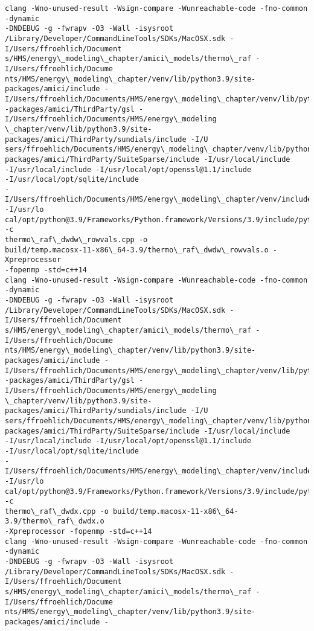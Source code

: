 \documentclass[11pt]{article}
\begin{document}
\begin{Verbatim}[commandchars=\\\{\}]
clang -Wno-unused-result -Wsign-compare -Wunreachable-code -fno-common -dynamic
-DNDEBUG -g -fwrapv -O3 -Wall -isysroot
/Library/Developer/CommandLineTools/SDKs/MacOSX.sdk -I/Users/ffroehlich/Document
s/HMS/energy\_modeling\_chapter/amici\_models/thermo\_raf -I/Users/ffroehlich/Docume
nts/HMS/energy\_modeling\_chapter/venv/lib/python3.9/site-packages/amici/include -
I/Users/ffroehlich/Documents/HMS/energy\_modeling\_chapter/venv/lib/python3.9/site
-packages/amici/ThirdParty/gsl -I/Users/ffroehlich/Documents/HMS/energy\_modeling
\_chapter/venv/lib/python3.9/site-packages/amici/ThirdParty/sundials/include -I/U
sers/ffroehlich/Documents/HMS/energy\_modeling\_chapter/venv/lib/python3.9/site-
packages/amici/ThirdParty/SuiteSparse/include -I/usr/local/include
-I/usr/local/include -I/usr/local/opt/openssl@1.1/include
-I/usr/local/opt/sqlite/include
-I/Users/ffroehlich/Documents/HMS/energy\_modeling\_chapter/venv/include -I/usr/lo
cal/opt/python@3.9/Frameworks/Python.framework/Versions/3.9/include/python3.9 -c
thermo\_raf\_dwdw\_rowvals.cpp -o
build/temp.macosx-11-x86\_64-3.9/thermo\_raf\_dwdw\_rowvals.o -Xpreprocessor
-fopenmp -std=c++14
clang -Wno-unused-result -Wsign-compare -Wunreachable-code -fno-common -dynamic
-DNDEBUG -g -fwrapv -O3 -Wall -isysroot
/Library/Developer/CommandLineTools/SDKs/MacOSX.sdk -I/Users/ffroehlich/Document
s/HMS/energy\_modeling\_chapter/amici\_models/thermo\_raf -I/Users/ffroehlich/Docume
nts/HMS/energy\_modeling\_chapter/venv/lib/python3.9/site-packages/amici/include -
I/Users/ffroehlich/Documents/HMS/energy\_modeling\_chapter/venv/lib/python3.9/site
-packages/amici/ThirdParty/gsl -I/Users/ffroehlich/Documents/HMS/energy\_modeling
\_chapter/venv/lib/python3.9/site-packages/amici/ThirdParty/sundials/include -I/U
sers/ffroehlich/Documents/HMS/energy\_modeling\_chapter/venv/lib/python3.9/site-
packages/amici/ThirdParty/SuiteSparse/include -I/usr/local/include
-I/usr/local/include -I/usr/local/opt/openssl@1.1/include
-I/usr/local/opt/sqlite/include
-I/Users/ffroehlich/Documents/HMS/energy\_modeling\_chapter/venv/include -I/usr/lo
cal/opt/python@3.9/Frameworks/Python.framework/Versions/3.9/include/python3.9 -c
thermo\_raf\_dwdx.cpp -o build/temp.macosx-11-x86\_64-3.9/thermo\_raf\_dwdx.o
-Xpreprocessor -fopenmp -std=c++14
clang -Wno-unused-result -Wsign-compare -Wunreachable-code -fno-common -dynamic
-DNDEBUG -g -fwrapv -O3 -Wall -isysroot
/Library/Developer/CommandLineTools/SDKs/MacOSX.sdk -I/Users/ffroehlich/Document
s/HMS/energy\_modeling\_chapter/amici\_models/thermo\_raf -I/Users/ffroehlich/Docume
nts/HMS/energy\_modeling\_chapter/venv/lib/python3.9/site-packages/amici/include -

\end{Verbatim}
\end{document}
